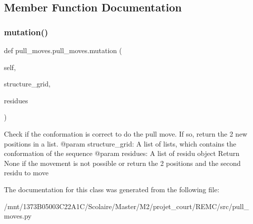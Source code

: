 \subsection{Member Function Documentation}
\mbox{\label{classpull__moves_1_1pull__moves_a2322051e5c24802bdcda8604e7a00b20}} 
\subsubsection{\texorpdfstring{mutation()}{mutation()}}
{\footnotesize\ttfamily def pull\+\_\+moves.\+pull\+\_\+moves.\+mutation (\begin{DoxyParamCaption}\item[{}]{self,  }\item[{}]{structure\+\_\+grid,  }\item[{}]{residues }\end{DoxyParamCaption})}

\begin{DoxyVerb}Check if the conformation is correct to do the pull move.
If so, return the 2 new positions in a list.
    @param structure_grid: A list of lists, which contains the
                   conformation of the sequence
    @param residues: A list of residu object
    Return None if the movement is not possible or return the 2
positions and the second residu to move
\end{DoxyVerb}
 

The documentation for this class was generated from the following file\+:\begin{DoxyCompactItemize}
\item 
/mnt/1373\+B05003\+C22\+A1\+C/\+Scolaire/\+Master/\+M2/projet\+\_\+court/\+R\+E\+M\+C/src/pull\+\_\+moves.\+py\end{DoxyCompactItemize}
